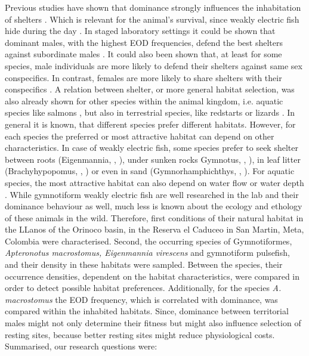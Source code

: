 Previous studies have shown that dominance strongly influences the inhabitation of shelters \citep{raab2019}.
Which is relevant for the animal's survival, since weakly electric fish hide during the day \citep{Hopkins_74}.     
In staged laboratory settings it could be shown that dominant males, with the highest EOD frequencies, defend the best shelters against subordinate males \citep{raab2019}.
It could also been shown that, at least for some species, male individuals are more likely to defend their shelters against same sex conspecifics. In contrast, females are more likely to share shelters with their conspecifics \citep{dunlap2002retreat}.
A relation between shelter, or more general habitat selection, was also already shown for other species within the animal kingdom, i.e. aquatic species like salmons \citep{redsalmon1995}, but also in terrestrial species, like redstarts \citep{sherry1989redstarts} or lizards \citep{downes1998heat}.
In general it is known, that different species prefer different habitats. However, for each species the preferred or most attractive habitat can depend on other characteristics.
In case of weakly electric fish, some species prefer to seek shelter between roots (Eigenmannia, \citeauthor{Hopkins_74}, \citeyear{Hopkins_74}), under sunken rocks Gymnotus, \citeauthor{westby1988ecology}, \citeyear{westby1988ecology}), in leaf litter (Brachyhypopomus, \citeauthor{hagedorn1988ecology}, \citeyear{hagedorn1988ecology}) or even in sand (Gymnorhamphichthys, \citeauthor{lissmann1965activity}, \citeyear{lissmann1965activity}).
For aquatic species, the most attractive habitat can also depend on water flow or water depth \citep{aadland1993stream}.
While gymnotiform weakly electric fish are well researched in the lab and their dominance behaviour as well, much less is known about the ecology and ethology of these animals in the wild. 
Therefore, first conditions of their natural habitat in the LLanos of the Orinoco basin, in the Reserva el Caduceo in San Martin, Meta, Colombia were characterised. 
Second, the occurring species of Gymnotiformes, \textit{Apteronotus macrostomus, Eigenmannia virescens} and gymnotiform pulsefish, and their density in these habitats were sampled.
Between the species, their occurrence densities, dependent on the habitat characteristics, were compared in order to detect possible habitat preferences.
Additionally, for the species \textit{A. macrostomus} the EOD frequency, which is correlated with dominance, was compared within the inhabited habitats. Since, dominance between territorial males might not only determine their fitness but might also influence selection of resting sites, because better resting sites might reduce physiological costs.
Summarised, our research questions were:\\

